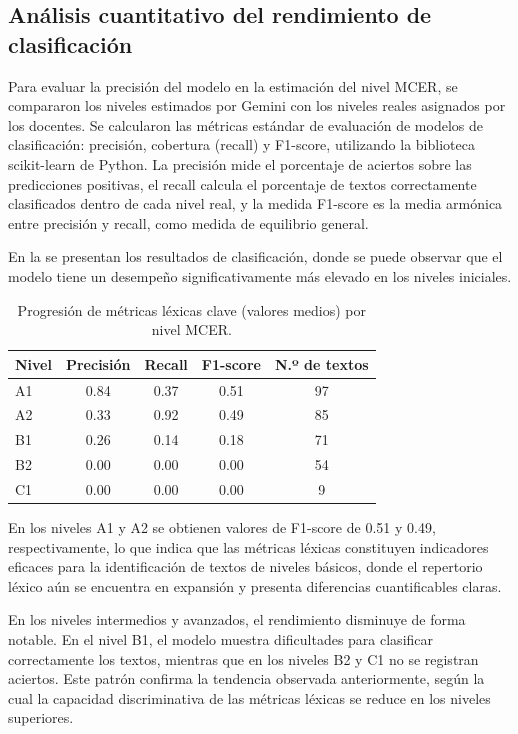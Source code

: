\documentclass[spanish]{textolivre}
\begin{document}
\subsection{Análisis cuantitativo del rendimiento de clasificación}

Para evaluar la precisión del modelo en la estimación del nivel MCER, se compararon los niveles estimados por Gemini con los niveles reales asignados por los docentes. Se calcularon las métricas estándar de evaluación de modelos de clasificación: precisión, cobertura (recall) y F1-score, utilizando la biblioteca scikit-learn de Python. La precisión mide el porcentaje de aciertos sobre las predicciones positivas, el recall calcula el porcentaje de textos correctamente clasificados dentro de cada nivel real, y la medida F1-score es la media armónica entre precisión y recall, como medida de equilibrio general.

En la  se presentan los resultados de clasificación, donde se puede observar que el modelo tiene un desempeño significativamente más elevado en los niveles iniciales.


\begin{table}[h]
\centering
\begin{threeparttable}
\caption{Progresión de métricas léxicas clave (valores medios) por nivel MCER.}
\label{tab2}
\begin{tabular}{lcccc}
        \toprule
        Nivel & Precisión & Recall & F1-score & N.º de textos \\
        \midrule
        A1 & 0.84 & 0.37 & 0.51 & 97 \\
        A2 & 0.33 & 0.92 & 0.49 & 85 \\
        B1 & 0.26 & 0.14 & 0.18 & 71 \\
        B2 & 0.00 & 0.00 & 0.00 & 54 \\
        C1 & 0.00 & 0.00 & 0.00 & 9 \\
        \bottomrule
\end{tabular}
\end{threeparttable}
\end{table}

En los niveles A1 y A2 se obtienen valores de F1-score de 0.51 y 0.49, respectivamente, lo que indica que las métricas léxicas constituyen indicadores eficaces para la identificación de textos de niveles básicos, donde el repertorio léxico aún se encuentra en expansión y presenta diferencias cuantificables claras.

En los niveles intermedios y avanzados, el rendimiento disminuye de forma notable. En el nivel B1, el modelo muestra dificultades para clasificar correctamente los textos, mientras que en los niveles B2 y C1 no se registran aciertos. Este patrón confirma la tendencia observada anteriormente, según la cual la capacidad discriminativa de las métricas léxicas se reduce en los niveles superiores.
\end{document}
